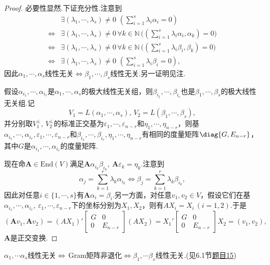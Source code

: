 \begin{proof}
	必要性显然.下证充分性.注意到
	\begin{align*}
		                    & {}\exists (\lambda_1,\cdots,\lambda_s)\ne0\,\,(\sum_{i=1}^s\lambda_i\alpha_i=0)                                              \\
		\Longleftrightarrow & {}\exists (\lambda_1,\cdots,\lambda_s)\ne0\,\forall k\in\mathbb{N}\,\biggl((\sum_{i=1}^s\lambda_i\alpha_i,\alpha_k)=0\biggr) \\
		\Longleftrightarrow & {}\exists (\lambda_1,\cdots,\lambda_s)\ne0\,\forall k\in\mathbb{N}\,\biggl((\sum_{i=1}^s\lambda_i\beta_i,\beta_k)=0\biggr)   \\
		\Longleftrightarrow & {}\exists (\lambda_1,\cdots,\lambda_s)\ne0\,\,(\sum_{i=1}^s\lambda_i\beta_i=0),
	\end{align*}
	因此$\alpha_1,\cdots,\alpha_s$线性无关$\Longleftrightarrow$$\beta_1,\cdots,\beta_s$线性无关.另一证明见注.

		假设$\alpha_{i_1},\cdots,\alpha_{i_r}$是$\alpha_1,\cdots,\alpha_s$的极大线性无关组，则$\beta_{i_1},\cdots,\beta_{i_r}$也是$\beta_1,\cdots,\beta_s$的极大线性无关组.记
	\[
		V_1=L(\alpha_1,\cdots,\alpha_s),\,V_2=L(\beta_1,\cdots,\beta_s),
	\]
	并分别取$V_1^\perp,\,V_2^\perp$的标准正交基为$\varepsilon_1,\cdots,\varepsilon_{n-r}$和$\eta_1,\cdots,\eta_{n-r}$，则基$\alpha_{i_1},\cdots,\alpha_{i_r},\varepsilon_1,\cdots,\varepsilon_{n-r}$和$\beta_{i_1},\cdots,\beta_{i_r},\eta_1,\cdots,\eta_{n-r}$有相同的度量矩阵$\diag{G,E_{n-r}}$，其中$G$是$\alpha_{i_1},\cdots,\alpha_{i_r}$的度量矩阵.

	现在命$\bm A\in\mathrm{End}(V)$满足$\bm A\alpha_{i_k}\beta_{i_k},\ \bm A\varepsilon_k=\eta_k$.注意到
	\[
		\alpha_j=\sum_{k=1}^r\lambda_k\alpha_{i_k}\iff\beta_j=\sum_{k=1}^r\lambda_k\beta_{i_k},
	\]
	因此对任意$i\in\{1,\cdots,s\}$有$\bm A\alpha_i=\beta_i$.另一方面，对任意$v_1,v_2\in V$，假设它们在基$\alpha_{i_1},\cdots,\alpha_{i_r},\ \varepsilon_1,\cdots,\varepsilon_{n-r}$下的坐标分别为$X_1,X_2$，则有$AX_i=X_i\,(i=1,2)$.于是
	\[
		(\bm A v_1,\bm A v_2)=(AX_1)'\begin{bmatrix}
			G & 0       \\
			0 & E_{n-r}
		\end{bmatrix}(AX_2)=X_1'\begin{bmatrix}
			G & 0       \\
			0 & E_{n-r}
		\end{bmatrix}X_2=(v_1,v_2),
	\]
	$\bm A$是正交变换.
\end{proof}
\begin{note}
	$\alpha_1,\cdots\alpha_s$线性无关$\Leftrightarrow$\,\textnormal{Gram}矩阵非退化$\Leftrightarrow$$\beta_1,\cdots\beta_s$线性无关.(见6.1节\hyperlink{GramMatrix}{题目15})
\end{note}
